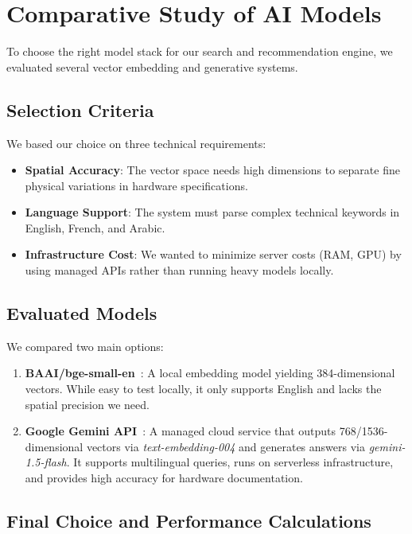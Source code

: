 \documentclass[12pt,a4paper]{report}
\begin{document}
\section{Comparative Study of AI Models}

To choose the right model stack for our search and recommendation engine, we evaluated several vector embedding and generative systems.

\subsection{Selection Criteria}

We based our choice on three technical requirements:
\begin{itemize}
    \item \textbf{Spatial Accuracy}: The vector space needs high dimensions to separate fine physical variations in hardware specifications.
    \item \textbf{Language Support}: The system must parse complex technical keywords in English, French, and Arabic.
    \item \textbf{Infrastructure Cost}: We wanted to minimize server costs (RAM, GPU) by using managed APIs rather than running heavy models locally.
\end{itemize}

\subsection{Evaluated Models}

We compared two main options:
\begin{enumerate}
    \item \textbf{BAAI/bge-small-en}~\cite{bge_embeddings}: A local embedding model yielding 384-dimensional vectors. While easy to test locally, it only supports English and lacks the spatial precision we need.
    \item \textbf{Google Gemini API}~\cite{gemini}: A managed cloud service that outputs 768/1536-dimensional vectors via \textit{text-embedding-004} and generates answers via \textit{gemini-1.5-flash}. It supports multilingual queries, runs on serverless infrastructure, and provides high accuracy for hardware documentation.
\end{enumerate}

\subsection{Final Choice and Performance Calculations}
\end{document}

